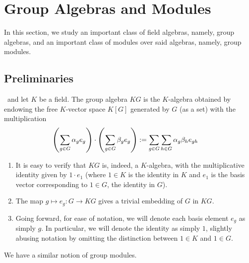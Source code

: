 \section{Group Algebras and Modules}

In this section, we study an important class of field algebras, namely, group algebras, and an important class of modules over said algebras, namely, group modules.

\subsection{Preliminaries}

\begin{boxdefinition}
    \ and let $K$ be a field. The group algebra $KG$ is the $K$-algebra obtained by endowing the free $K$-vector space $K[G]$ generated by $G$ (as a set) with the multiplication
    \begin{align*}
        \left( \sum_{g \in G} \alpha_g e_g \right) \cdot \left( \sum_{g \in G} \beta_g e_g \right) &:= \sum_{g \in G} \sum_{h \in G} \alpha_{g} \beta_h e_{gh}
    \end{align*}
\end{boxdefinition}
\begin{remark} \hfill
    \begin{enumerate}[noitemsep]
        \item It is easy to verify that $KG$ is, indeed, a $K$-algebra, with the multiplicative identity given by $1 \cdot e_1$ (where $1 \in K$ is the identity in $K$ and $e_1$ is the basis vector corresponding to $1 \in G$, the identity in $G$).
        \item The map $g \mapsto e_g : G \to KG$ gives a trivial embedding of $G$ in $KG$.
        \item Going forward, for ease of notation, we will denote each basis element $e_g$ as simply $g$. In particular, we will denote the identity as simply $1$, slightly abusing notation by omitting the distinction between $1 \in K$ and $1 \in G$.
    \end{enumerate}
\end{remark}

We have a similar notion of group modules.

